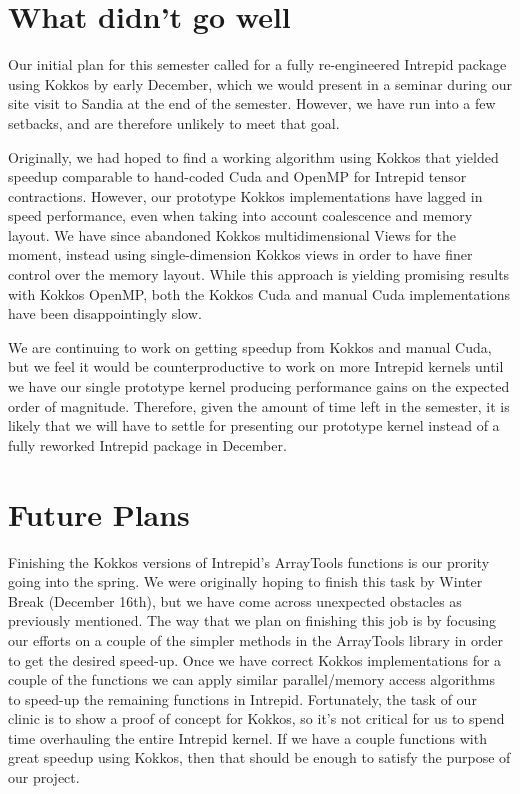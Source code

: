 \documentclass{hmcclinic}
\begin{document}
\section*{What didn't go well}
Our initial plan for this semester called for a fully re-engineered Intrepid
package using Kokkos by early December, which we would present in a seminar
during our site visit to Sandia at the end of the semester.  However, we have
run into a few setbacks, and are therefore unlikely to meet that goal.

Originally, we had hoped to find a working algorithm using Kokkos that yielded
speedup comparable to hand-coded Cuda and OpenMP for Intrepid tensor
contractions.  However, our prototype Kokkos implementations have lagged in
speed performance, even when taking into account coalescence and memory layout.
We have since abandoned Kokkos multidimensional Views for the moment, instead
using single-dimension Kokkos views in order to have finer control over the
memory layout.  While this approach is yielding promising results with Kokkos
OpenMP, both the Kokkos Cuda and manual Cuda implementations have been
disappointingly slow.

We are continuing to work on getting speedup from Kokkos and manual Cuda, but
we feel it would be counterproductive to work on more Intrepid kernels until we
have our single prototype kernel producing performance gains on the expected
order of magnitude.  Therefore, given the amount of time left in the semester,
it is likely that we will have to settle for presenting our prototype kernel
instead of a fully reworked Intrepid package in December. 

\section*{Future Plans}
Finishing the Kokkos versions of Intrepid's ArrayTools functions is our prority going into the
spring.  We were originally hoping to finish this task by Winter Break (December 16th), but we have 
come across unexpected obstacles as previously mentioned. The way that we plan on finishing 
this job is by focusing our efforts on a couple of the simpler methods in the ArrayTools library 
in order to get the desired speed-up. Once we have correct Kokkos implementations for a couple of
the functions we can apply similar parallel/memory access algorithms to speed-up
the remaining functions in Intrepid. Fortunately, the task of our clinic is to show a proof of concept 
for Kokkos, so it's not critical for us to spend time overhauling the entire Intrepid kernel. 
If we have a couple functions  with great speedup using Kokkos, then that should be enough
to satisfy the purpose of our project. 
\end{document}

